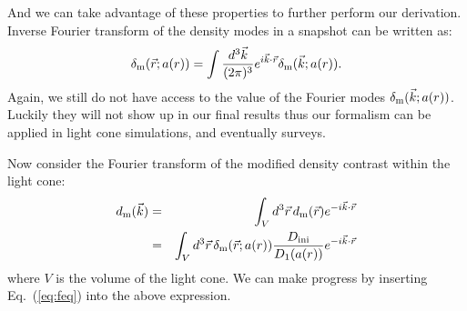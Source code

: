 \documentclass[prd,amsmath,amssymb,floatfix,superscriptaddress,nofootinbib,twocolumn]{revtex4-1}
\def\be{\begin{equation}}
\def\ee{\end{equation}}
\def\bea{\begin{eqnarray}}
\def\eea{\end{eqnarray}}
\newcommand{\LC}{\rm LC}
\newcommand{\ini}{\rm ini}
\newcommand{\vrr}{\vec{r}}
\newcommand{\vs}{\nonumber\\}
\newcommand{\vk}{\vec{k}}
\newcommand{\ec}[1]{Eq.~(\ref{eq:#1})}
\newcommand{\eql}[1]{\label{eq:#1}}
\newcommand{\peikai}[1]{{\color{blue} #1}}
\begin{document}
And we can take advantage of these properties to further perform our derivation. Inverse Fourier transform of the density modes in a snapshot can be written as:
\be 
\dm(\vrr;a(r)) =\int \frac{d^3 \vk}{(2\pi)^3}e^{i\vk\cdot\vrr}\dm(\vk;a(r))\eql{feq}
.\ee 
Again, we still do not have access to the value of the Fourier modes $\delta_{\rm m}(\vk;a(r))$. Luckily they will not show up in our final results thus our formalism can be applied in light cone simulations, and eventually surveys. 

Now consider the Fourier transform of the modified density contrast within the light cone:
\bea
\dlc(\vk) &=&\int_{V} d^3\vrr  \, \dlc(\vrr)  e^{-i\vk \cdot\vrr} \vs
&=&\int_{V} d^3\vrr  \, \dm(\vrr;a(r)) \frac{D_{\ini}}{D_{1}(a(r))}  e^{-i\vk \cdot\vrr}
\eql{LCM}
\eea
\peikai{where $V$ is the volume of the light cone.} We can make progress by \peikai{inserting \ec{feq} into the above expression.}
\end{document}
